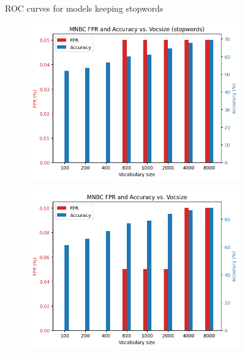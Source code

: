\documentclass{article}
\begin{document}
\begin{multicols}{2}
\begin{figure}[H]
        \caption{\footnotesize ROC curves for models keeping stopwords}
        \label{fig:ROC}
    \end{figure}    

    \begin{figure}[H]
        \begin{subfigure}{\linewidth}
        \centering
        \includegraphics[width=0.96\columnwidth]{Figures/FPR_mnbc_stop.png}
        \end{subfigure}
        
        \begin{subfigure}{\linewidth}
        \centering
        \includegraphics[width=0.96\columnwidth]{Figures/FPR_mnbc_nostop.png}
        \end{subfigure}
        

\end{figure}
\end{multicols}
\end{document}

